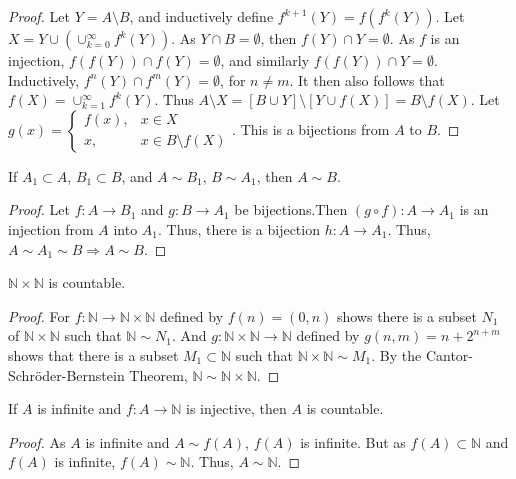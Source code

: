             \begin{proof}
            Let $Y = A\setminus B$, and inductively define $f^{k+1}(Y) = f(f^{k}(Y))$. Let $X = Y\cup (\cup_{k=0}^{\infty} f^{k}(Y))$. As $Y\cap B = \emptyset$, then $f(Y)\cap Y= \emptyset$. As $f$ is an injection, $f(f(Y))\cap f(Y)=\emptyset$, and similarly $f(f(Y))\cap Y = \emptyset$. Inductively, $f^{n}(Y)\cap f^{m}(Y) = \emptyset$, for $n\ne m$. It then also follows that $f(X) = \cup_{k=1}^{\infty} f^{k}(Y)$. Thus $A\setminus X = [B\cup Y]\setminus [Y\cup f(X)] = B\setminus f(X)$. Let $g(x) = \begin{cases} f(x), & x\in X \\ x, & x \in B\setminus f(X)\end{cases}$. This is a bijections from $A$ to $B$.
            \end{proof}
            \begin{theorem}
            If $A_1 \subset A$, $B_1 \subset B$, and $A\sim B_1$, $B \sim A_1$, then $A\sim B$.
            \end{theorem}
            \begin{proof}
            Let $f:A\rightarrow B_1$ and $g:B\rightarrow A_1$ be bijections.Then $(g\circ f):A\rightarrow A_1$ is an injection from $A$ into $A_1$. Thus, there is a bijection $h:A\rightarrow A_1$. Thus, $A\sim A_1 \sim B\Rightarrow A\sim B$.
            \end{proof}
            \begin{theorem}
            $\mathbb{N}\times \mathbb{N}$ is countable.
            \end{theorem}
            \begin{proof}
            For $f:\mathbb{N} \rightarrow \mathbb{N}\times \mathbb{N}$ defined by $f(n) = (0,n)$ shows there is a subset $N_1$ of $\mathbb{N} \times \mathbb{N}$ such that $\mathbb{N}\sim N_1$. And $g:\mathbb{N}\times \mathbb{N} \rightarrow \mathbb{N}$ defined by $g(n,m) =n+2^{n+m}$ shows that there is a subset $M_1 \subset \mathbb{N}$ such that $\mathbb{N} \times \mathbb{N} \sim M_1$. By the Cantor-Schr\"{o}der-Bernstein Theorem, $\mathbb{N} \sim \mathbb{N}\times \mathbb{N}$.
            \end{proof}
            \begin{lemma}
            If $A$ is infinite and $f:A\rightarrow \mathbb{N}$ is injective, then $A$ is countable.
            \end{lemma}
            \begin{proof}
            As $A$ is infinite and $A\sim f(A)$, $f(A)$ is infinite. But as $f(A)\subset \mathbb{N}$ and $f(A)$ is infinite, $f(A)\sim \mathbb{N}$. Thus, $A\sim \mathbb{N}$. 
            \end{proof}
